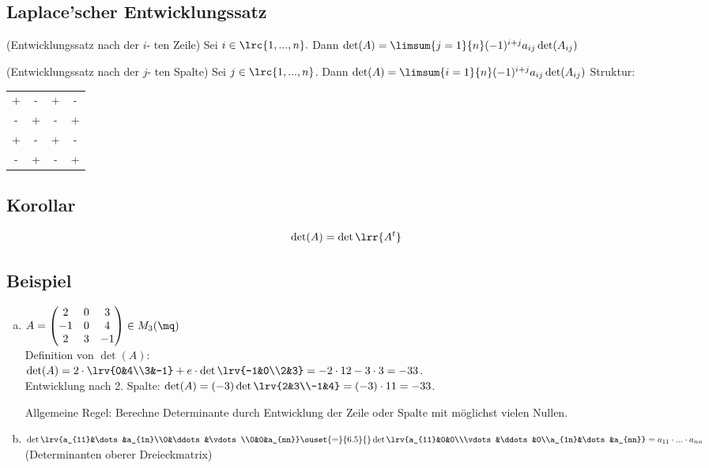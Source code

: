 \subsection{Laplace'scher Entwicklungssatz}
    \item (Entwicklungssatz nach der $i$- ten Zeile)
      Sei $i\in\lrc{1,...,n}.$ Dann
      $\det(A)=\limsum{j=1}{n}(-1)^{i+j}a_{ij}\det(A_{ij})$
    \item (Entwicklungssatz nach der $j$- ten Spalte)
      Sei $j\in\lrc{1,...,n}$. Dann
      $\det(A)=\limsum{i=1}{n}(-1)^{i+j}a_{ij}\det(A_{ij})$
  \subExEnd
  Struktur:\begin{tabular}{cccc}+&-&+&-\\-&+&-&+\\+&-&+&-\\-&+&-&+\end{tabular}

\subsection{Korollar}
  \[\det(A)=\det\lrr{A^t}\]

\subsection{Beispiel}
  \begin{enumerate}[a)]
    \item $A=\begin{pmatrix}2&0&3\\-1&0&4\\2&3&-1\end{pmatrix}\in M_3(\mq)$\\
      Definition von $\det(A)$:\\
      $\det(A)=2\cdot\lrv{0&4\\3&-1}+e\cdot\det\lrv{-1&0\\2&3}=-2\cdot
      12-3\cdot 3=-33$.\\ Entwicklung nach 2. Spalte:
      $\det(A)=(-3)\det\lrv{2&3\\-1&4}=(-3)\cdot 11=-33$.

      Allgemeine Regel: Berechne Determinante durch Entwicklung der Zeile oder
      Spalte mit möglichst vielen Nullen.

    \item
      $\det\lrv{a_{11}&\dots&a_{1n}\\0&\ddots&\vdots\\0&0&a_{nn}}\ouset{=}{6.5}{}\det\lrv{a_{11}&0&0\\\vdots&\ddots&0\\a_{1n}&\dots&a_{nn}}=a_{11}\cdot...\cdot a_{nn}$\\
      (Determinanten oberer Dreieckmatrix)
  \end{enumerate}
